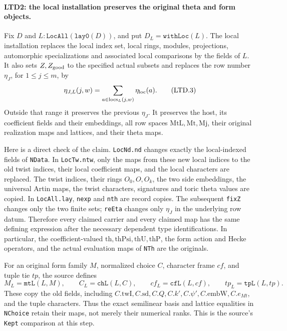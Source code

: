\paragraph{LTD2: the local installation preserves the original theta and form objects.}
\label{claim:LTD2}
Fix \(D\) and \(L:\texttt{LocAll}(\texttt{lay0}(D))\), and put
\(D_L=\texttt{withLoc}(L)\).  The local installation replaces the
local index set, local rings, modules, projections, automorphic
specializations and associated local comparisons by the fields of
\(L\).  It also sets \(Z,Z_{\rm good}\) to the specified actual
subsets and replaces the row number \(\eta_J\), for \(1\le j\le m\),
by
\[
       \eta_{J,L}(j,w)=\sum_{a\in\mathrm{locs}_L(j,w)}\eta_{\rm loc}(a).
       \tag{LTD.3}
\]
Outside that range it preserves the previous \(\eta_J\).
It preserves the host, its coefficient fields and their embeddings,
all row spaces \(\mathrm{MtL},\mathrm{Mt},\mathrm{Mj}\), their
original realization maps and lattices, and their theta maps.

Here is a direct check of the claim.  \texttt{LocNd.nd} changes
exactly the local-indexed fields of \texttt{NData}.  In
\texttt{LocTw.ntw}, only the maps from these new local indices to
the old twist indices, their local coefficient maps, and the local
characters are replaced.  The twist indices, their rings \(O_0,O,O_k\),
the two side embeddings, the universal Artin maps, the twist
characters, signatures and toric theta values are copied.  In
\texttt{LocAll.lay}, \texttt{nexp} and \texttt{nth} are record
copies.  The subsequent \texttt{fixZ} changes only the two finite
sets; \texttt{reEta} changes only \(\eta_J\) in the underlying
row datum.  Therefore every claimed carrier and every claimed map
has the same defining expression after the necessary dependent
type identifications.  In particular, the coefficient-valued
\(\mathrm{th},\mathrm{thPsi},\mathrm{thU},\mathrm{thP}\), the
form action and Hecke operators, and the actual evaluation maps
of \texttt{NTh} are the originals.

For an original form family \(M\), normalized choice \(C\),
character frame \(cf\), and tuple tie \(tp\), the source defines
\[
 M_L=\texttt{mtL}(L,M),\qquad C_L=\texttt{chL}(L,C),\qquad
 cf_L=\texttt{cfL}(L,cf),\qquad tp_L=\texttt{tpL}(L,tp).
 \tag{LTD.4}
\]
These copy the old fields, including \(C.\mathrm{twI},C.\mathrm{sd},
C.Q,C.k',C.\psi',C.\mathrm{embW},C.e_{Mt}\), and the tuple
characters.  Thus the exact semilinear basis and lattice equalities
in \texttt{NChoice} retain their maps, not merely their numerical
ranks.  This is the source's \texttt{Kept} comparison at this step.


